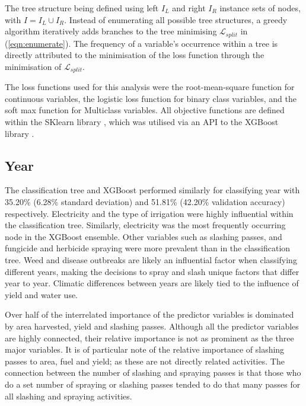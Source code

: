 \documentclass[review,12pt,authoryear]{elsarticle}
\begin{document}
\begin{linenumbers}
The tree structure being defined using left $I_L$ and right $I_R$ instance sets of nodes, with $I = I_L \cup I_R$. Instead of enumerating all possible tree structures, a greedy algorithm iteratively adds branches to the tree minimising $ \mathcal{L}_{split} $ in (\ref{eqn:enumerate}). The frequency of a variable's occurrence within a tree is directly attributed to the minimisation of the loss function through the minimisation of $ \mathcal{L}_{split} $.
\par
The loss functions used for this analysis were the root-mean-square function for continuous variables, the logistic loss function for binary class variables, and the soft max function for Multiclass variables. All objective functions are defined within the SKlearn library \citep{sklearn_api}, which was utilised via an API to the XGBoost library \citep{chenXGBoostScalableTree2016}.
\par
\subsection{Year}

 The classification tree and XGBoost performed similarly for classifying year with 35.20\% (6.28\% standard deviation) and 51.81\% (42.20\% validation accuracy) respectively. Electricity and the type of irrigation were highly influential within the classification tree. Similarly, electricity was the most frequently occurring node in the XGBoost ensemble. Other variables such as slashing passes, and fungicide and herbicide spraying were more prevalent than in the classification tree. Weed and disease outbreaks are likely an influential factor when classifying different years, making the decisions to spray and slash unique factors that differ year to year. Climatic differences between years are likely tied to the influence of yield and water use.
 \par
 Over half of the interrelated importance of the predictor variables is dominated by area harvested, yield and slashing passes. Although all the predictor variables are highly connected, their relative importance is not as prominent as the three major variables. It is of particular note of the relative importance of slashing passes to area, fuel and yield; as these are not directly related activities. The connection between the number of slashing and spraying passes is that those who do a set number of spraying or slashing passes tended to do that many passes for all slashing and spraying activities.
 

\end{linenumbers}
\end{document}
